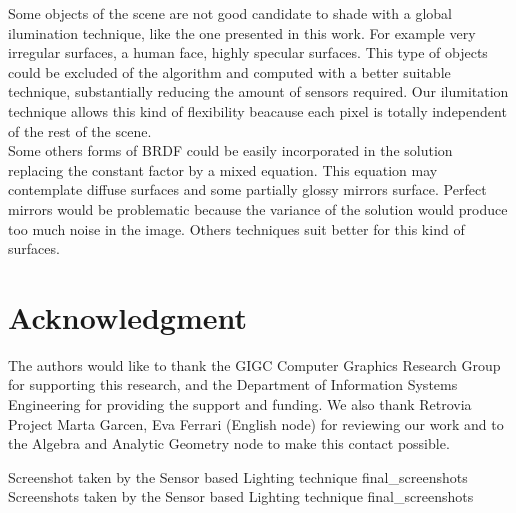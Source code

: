 \documentclass[10pt, conference]{IEEEtran}
\begin{document}
Some objects of the scene are not good candidate to shade with a global ilumination technique, like the one presented in this work. 
For example very irregular surfaces, a human face, highly specular surfaces.
This type of objects could be excluded of the algorithm and computed with a better suitable technique, substantially reducing the amount of sensors required.
Our ilumitation technique allows this kind of flexibility beacause each pixel is totally independent of the rest of the scene.\\

Some others forms of BRDF could be easily incorporated in the solution replacing the constant factor by a mixed equation. 
This equation may contemplate diffuse surfaces and some partially glossy mirrors surface. 
Perfect mirrors would be problematic because the variance of the solution would produce too much noise in the image. 
Others techniques suit better for this kind of surfaces.\\






\iffinal
\section*{Acknowledgment}
%
The authors would like to thank the GIGC Computer Graphics Research Group for supporting this research, and the Department of Information Systems 
Engineering for providing the support and funding. We also thank Retrovia Project Marta Garcen, Eva Ferrari (English node) for reviewing our work 
and to the Algebra and Analytic Geometry node to make this contact possible.
\fi













\subimages
	{Screenshot taken by the Sensor based Lighting technique}
	{final_screenshots}{
}
\subimages
	{Screenshots taken by the Sensor based Lighting technique}
	{final_screenshots}{
}
\end{document}
